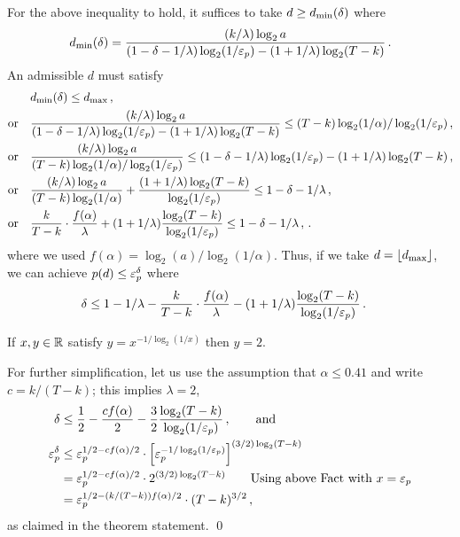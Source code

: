   For the above inequality to hold, 
  it suffices to take $d \geq d_\mathrm{min}(\delta)$ where 
  $$
    d_\mathrm{min}(\delta) = \frac{(k/\lambda) \log_2 a}{(1 - \delta - 1/\lambda) \log_2(1/\mathsf{\varepsilon}_p) - (1+1/\lambda) \log_2(T - k)}
    \,.
  $$
  An admissible $d$ must satisfy
  \begin{align*}
    &d_\mathrm{min}(\delta) \leq d_\mathrm{max} \,,\\
    \text{or}\quad &      
      \frac{(k/\lambda) \log_2 a}{(1 - \delta - 1/\lambda) \log_2(1/\mathsf{\varepsilon}_p) - (1+1/\lambda) \log_2(T - k)}
        \leq (T - k) \log_2(1/\alpha)/\log_2(1/\mathsf{\varepsilon}_p) \,,\\
    \text{or}\quad &      
      \frac{(k/\lambda) \log_2 a}{(T - k) \log_2(1/\alpha)/\log_2(1/\mathsf{\varepsilon}_p)} 
        \leq (1 - \delta - 1/\lambda) \log_2(1/\mathsf{\varepsilon}_p) - (1+1/\lambda) \log_2(T - k) \,,\\
    \text{or}\quad &      
      \frac{(k/\lambda) \log_2 a}{(T - k) \log_2(1/\alpha)} + \frac{(1+1/\lambda) \log_2(T - k)}{\log_2(1/\mathsf{\varepsilon}_p)}
        \leq 1 - \delta - 1/\lambda  \,,\\
    \text{or}\quad &      
      \frac{k}{T-k}\cdot \frac{f(\alpha)}{\lambda} + (1+1/\lambda) \frac{ \log_2(T - k)}{\log_2(1/\mathsf{\varepsilon}_p)}
        \leq 1 - \delta - 1/\lambda  \,,
        \,.
  \end{align*}
  where we used $f(\alpha) = \log_2(a)/\log_2(1/\alpha)$. 
  Thus, if we take $d = \lfloor d_\mathrm{max} \rfloor$, we can achieve  $p(d) \leq \mathsf{\varepsilon}_p^{\delta}$ 
  where 
  \begin{align}
    \delta
      &\leq 1 - 1/\lambda - \frac{k}{T-k}\cdot \frac{f(\alpha)}{\lambda} - (1+1/\lambda) \frac{ \log_2(T - k)}{\log_2(1/\mathsf{\varepsilon}_p)}\,. \label{eq:delta}    
  \end{align}


  \begin{fact*}
    If $x,y \in \mathbb{R}$ satisfy $y = x^{-1/\log_2(1/x)}$ then $y = 2$.
  \end{fact*}
  \noindent
  For further simplification, let us use the assumption that $\alpha \leq 0.41$ 
  and write $c = k/(T-k)$; 
  this implies $\lambda = 2$, 
  \begin{align*}
    \delta
      &\leq \frac{1}{2} - \frac{c f(\alpha)}{2} - \frac{3}{2} \frac{ \log_2(T - k)}{\log_2(1/\mathsf{\varepsilon}_p)}\,, 
      \qquad \text{and}\\
    \mathsf{\varepsilon}_p^\delta  
      &\leq \mathsf{\varepsilon}_p^{1/2 - c f(\alpha)/2} \cdot \left[ \mathsf{\varepsilon}_p^{-1/\log_2(1/\mathsf{\varepsilon}_p)} \right]^{(3/2)\log_2(T - k)} \\
      &= \mathsf{\varepsilon}_p^{1/2 - c f(\alpha)/2} \cdot 2^{(3/2)\log_2(T - k)} \qquad\text{Using above Fact with $x = \mathsf{\varepsilon}_p$}\\
      &= \mathsf{\varepsilon}_p^{1/2 - (k/(T-k)) f(\alpha)/2} \cdot (T - k)^{3/2} 
      \,,
  \end{align*}
  as claimed in the theorem statement. 
\hfill\qed


